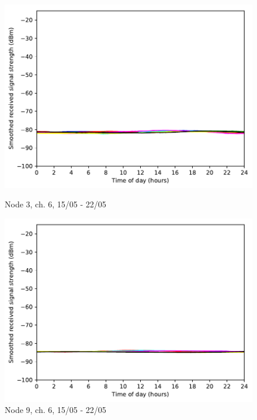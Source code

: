 \documentclass[a4paper, 11pt]{article}
\begin{document}
\begin{figure}
\begin{minipage}{0.47\textwidth}
\end{minipage}\hfill
\begin{minipage}{0.47\textwidth}
    \centering
	\includegraphics[width=\textwidth]{images/2_4_GHz/cot-node3-student_2017-05-21_chan6_image}
    \caption{Node 3, ch. 6, 15/05 - 22/05} \label{node3-6}
\end{minipage}\hfill
\begin{minipage}{0.47\textwidth}
    \centering
	\includegraphics[width=\textwidth]{images/2_4_GHz/cot-node9-student_2017-05-21_chan6_image}
    \caption{Node 9, ch. 6, 15/05 - 22/05} \label{node9-6}
\end{minipage}\hfill
\begin{minipage}{0.47\textwidth}
    \centering

\end{minipage}
\end{figure}
\end{document}
